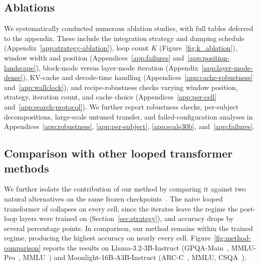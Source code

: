 \subsection{Ablations}
\label{sec:ablation-summary}

We systematically conducted numerous ablation studies, with full tables deferred to the appendix. These include the integration strategy and damping schedule (Appendix~\ref{app:strategy-ablation}), loop count $K$ (Figure~\ref{fig:k_ablation}), window width and position (Appendices~\ref{app:failures} and~\ref{app:position-landscape}), block-mode versus layer-mode iteration (Appendix~\ref{app:layer-mode-dense}), KV-cache and decode-time handling (Appendices~\ref{app:cache-robustness} and~\ref{app:wallclock}), and recipe-robustness checks varying window position, strategy, iteration count, and cache choice (Appendices~\ref{app:per-cell} and~\ref{app:search-protocol}). We further report robustness checks, per-subject decompositions, large-scale untuned transfer, and failed-configuration analyses in Appendices~\ref{app:robustness}, \ref{app:per-subject}, \ref{app:scale30b}, and~\ref{app:failures}.

\subsection{Comparison with other looped transformer methods}
\label{sec:method-comparison}

We further isolate the contribution of our method by comparing it against two natural alternatives on the same frozen checkpoints~\citep{dehghani2019universal,yang2025looped,geiping2025scaling,zhu2025ouro,bae2024relaxed,bae2025mor,jeddi2026loopformer,oncescu2026recurrent,tang2026looprpt,saunshi2025reasoning,xu2025expressive,wu2025parallel}. The naive looped transformer of \cite{liu2024looped} collapses on every cell, since the iterates leave the regime the post-loop layers were trained on (Section~\ref{sec:strategy}), and accuracy drops by several
percentage points. In comparison, our method remains within the trained regime, producing the highest accuracy on nearly every cell. Figure~\ref{fig:method-comparison} reports the results on Llama-3.2-3B-Instruct (GPQA-Main~\citep{rein2024gpqa}, MMLU-Pro~\citep{wang2024mmlupro}, MMLU~\citep{hendrycks2021mmlu}) and Moonlight-16B-A3B-Instruct (ARC-C~\citep{clark2018arc}, MMLU, CSQA~\citep{talmor2019csqa}).


